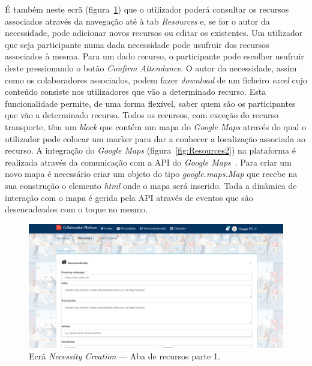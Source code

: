É também neste ecrã (figura~\ref{fig:Resources1}) que o utilizador poderá consultar os recursos associados através da navegação até à tab \textit{Resources} e, se for o autor da necessidade, pode adicionar novos recursos ou editar os existentes. 
Um utilizador que seja participante numa dada necessidade pode usufruir dos recursos associados à mesma.
Para um dado recurso, o participante pode escolher usufruir deste pressionando o botão \textit{Confirm Attendance}.
O autor da necessidade, assim como os colaboradores associados, podem fazer \textit{download} de um ficheiro \textit{excel} cujo conteúdo consiste nos utilizadores que vão a determinado recurso. 
Esta funcionalidade permite, de uma forma flexível, saber quem são os participantes que vão a determinado recurso.
Todos os recursos, com exceção do recurso transporte, têm um \textit{block} que contém um mapa do \textit{Google Maps} através do qual o utilizador pode colocar um marker para dar a conhecer a localização associada ao recurso. 
A integração do \textit{Google Maps} (figura~\ref{fig:Resources2}) na plataforma é realizada através da comunicação com a API do \textit{Google Maps}~\cite{google maps api}. 
Para criar um novo mapa é necessário criar um objeto do tipo \textit{google.maps.Map} que recebe na sua construção o elemento \textit{html} onde o mapa será inserido. 
Toda a dinâmica de interação com o mapa é gerida pela API através de eventos que são desencadeados com o toque no mesmo. 

\begin{figure}[H]
  \centering 
  \includegraphics[scale=0.4]{figures/Resources1.png}
  \caption{Ecrã \textit{Necessity Creation} --- Aba de recursos parte 1.}\label{fig:Resources1}
\end{figure}



